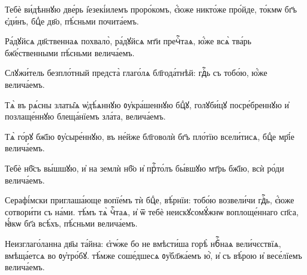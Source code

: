 \hKv Тебѐ ви́дѣннꙋю две́рь і҆езекі́илемъ проро́комъ, є҆́юже  никто́же про́йде, то́кмѡ бг҃ъ є҆ди́нъ, бцⷣе дв҃о, пѣ́сньми  почита́емъ. 

\hKv Ра́дꙋйсѧ дв҃ственнаѧ похвало̀, ра́дꙋйсѧ мт҃и пречⷭ҇таѧ, ю҆́же  всѧ̀ тва́рь бж҃е́ственными пѣ́сньми велича́емъ. 

\hKv Слꙋжи́тель безпло́тный предста̀ глаго́лѧ бл҃года́тнѣй: гдⷭ҇ь съ  тобо́ю, ю҆́же велича́емъ. 

\hKv Тѧ̀ въ рѧ́сны златы̑ѧ ѡ҆дѣ́ѧннꙋю ᲂу҆кра́шеннꙋю бцⷣꙋ,  голꙋби́цꙋ посре́бреннꙋю и҆ позлаще́ннꙋю блеща́нїемъ зла́та,  велича́емъ. 

\hKv Тѧ̀ го́рꙋ бж҃їю ᲂу҆сыре́ннꙋю, въ не́йже бл҃говолѝ бг҃ъ пло́тїю  всели́тисѧ, бцⷣе мр҃і́е велича́емъ. 

\hKv Тебѐ нб҃съ вы́шшꙋю, и҆ на землѝ нб҃о и҆ прⷭ҇то́лъ бы́вшꙋю мт҃рь  бж҃їю, всѝ ро́ди велича́емъ. 

\hKv Серафі́мски приглаша́юще вопїе́мъ тѝ бцⷣе, вѣ́рнїи: тобо́ю  возвели́чи гдⷭ҇ь, є҆́юже сотвори́ти съ на́ми. тѣ́мъ тѧ̀ чⷭ҇таѧ, и҆  ѿ тебѐ  неискꙋсомꙋ́жнѡ воплоще́ннаго  сп҃са, ꙗ҆́кѡ бг҃а всѣ́хъ, пѣ́сньми велича́емъ. 

\hKv Неизглаго́ланна дв҃ы та́йна: є҆гѡ́же бо не вмѣсти́ша горѣ̀ нбⷭ҇наѧ  вели́чєствїѧ, вмѣща́етсѧ во ᲂу҆тро́бꙋ. тѣ́мже соше́дшесѧ  ᲂу҆бл҃жа́емъ ю҆̀, и҆ съ вѣ́рою и҆ весе́лїемъ велича́емъ.  
